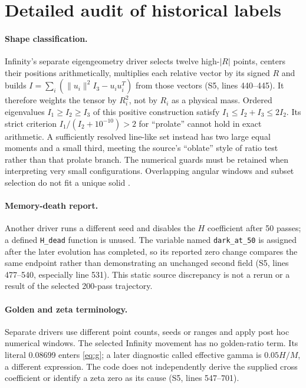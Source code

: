 \documentclass[11pt,a4paper]{article}
\newcommand{\src}[2]{\textsf{#1}, lines #2}
\begin{document}
\section{Detailed audit of historical labels}
\label{app:audit}
\paragraph{Shape classification.} Infinity's separate eigengeometry driver selects twelve high-$|R|$ points, centers their positions arithmetically, multiplies each relative vector by its signed $R$ and builds $I=\sum_i(\|u_i\|^2I_3-u_iu_i^T)$ from those vectors (\src{S5}{440--445}). It therefore weights the tensor by $R_i^2$, not by $R_i$ as a physical mass. Ordered eigenvalues $I_1\geq I_2\geq I_3$ of this positive construction satisfy $I_1\leq I_2+I_3\leq2I_2$. Its strict criterion $I_1/(I_2+10^{-10})>2$ for ``prolate'' cannot hold in exact arithmetic. A sufficiently resolved line-like set instead has two large equal moments and a small third, meeting the source's ``oblate'' style of ratio test rather than that prolate branch. The numerical guards must be retained when interpreting very small configurations. Overlapping angular windows and subset selection do not fit a unique solid \cite{evidence5,review5}.

\paragraph{Memory-death report.} Another driver runs a different seed and disables the $H$ coefficient after 50 passes; a defined \texttt{H\_dead} function is unused. The variable named \texttt{dark\_at\_50} is assigned after the later evolution has completed, so its reported zero change compares the same endpoint rather than demonstrating an unchanged second field (\src{S5}{477--540}, especially line 531). This static source discrepancy is not a rerun or a result of the selected 200-pass trajectory.

\paragraph{Golden and zeta terminology.} Separate drivers use different point counts, seeds or ranges and apply post hoc numerical windows. The selected Infinity movement has no golden-ratio term. Its literal 0.08699 enters \eqref{eq:g}; a later diagnostic called effective gamma is $0.05H/M$, a different expression. The code does not independently derive the supplied cross coefficient or identify a zeta zero as its cause (\src{S5}{547--701}).
\end{document}
